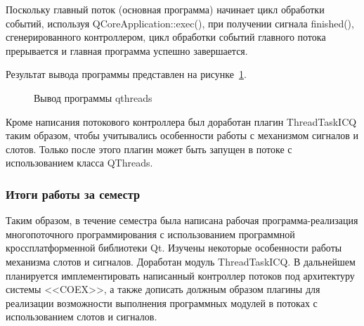 Поскольку главный поток (основная программа) начинает цикл обработки событий, используя QCoreApplication::exec(), при получении сигнала finished(), сгенерированного контроллером, цикл обработки событий главного потока прерывается и главная программа успешно завершается. 

Результат вывода программы представлен на рисунке~\ref{program-output:program-output}.

\begin{figure}[h!]
\caption{ Вывод программы qthreads }
\label{program-output:program-output}
\end{figure}

Кроме написания потокового контроллера был доработан плагин ThreadTaskICQ таким образом, чтобы учитывались особенности работы с механизмом сигналов и слотов. Только после этого плагин может быть запущен в потоке с использованием класса QThreads.  

\subsubsection{Итоги работы за семестр}

Таким образом, в течение семестра была написана рабочая программа-реализация многопоточного программирования с использованием программной кроссплатформенной библиотеки Qt. Изучены некоторые особенности работы механизма слотов и сигналов. Доработан модуль ThreadTaskICQ. В дальнейшем планируется имплементировать написанный контроллер потоков под архитектуру системы <<COEX>>, а также дописать должным образом плагины для реализации возможности выполнения программных модулей в потоках с использованием слотов и сигналов. 




